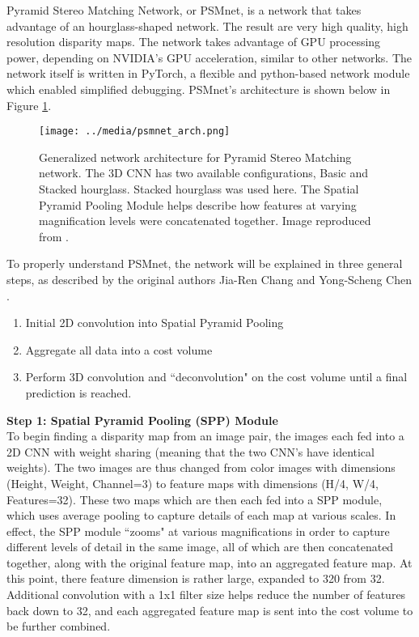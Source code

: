 Pyramid Stereo Matching Network, or PSMnet, is a network that takes advantage of an hourglass-shaped network. The result are very high quality, high resolution disparity maps. The network takes advantage of GPU processing power, depending on NVIDIA's GPU acceleration, similar to other networks. The network itself is written in PyTorch, a flexible and python-based network module which enabled simplified debugging. PSMnet's architecture is shown below in Figure \ref{psmnet_arch}.


\begin{figure}[ht]
	\texttt{[image: ../media/psmnet\_arch.png]}
	\caption{Generalized network architecture for Pyramid Stereo Matching network. The 3D CNN has two available configurations, Basic and Stacked hourglass. Stacked hourglass was used here. The Spatial Pyramid Pooling Module helps describe how features at varying magnification levels were concatenated together. Image reproduced from \cite{chang_pyramid_2018}.}
	\label{psmnet_arch}
\end{figure}


To properly understand PSMnet, the network will be explained in three general steps, as described by the original authors Jia-Ren Chang and Yong-Scheng Chen \cite{chang_pyramid_2018}. 

\begin{enumerate}\itemsep=-0.5em
    \item Initial 2D convolution into Spatial Pyramid Pooling 
    \item Aggregate all data into a cost volume
    \item Perform 3D convolution and ``deconvolution" on the cost volume until a final prediction is reached.
\end{enumerate}

\textbf{{\large Step 1: Spatial Pyramid Pooling (SPP) Module}} \\
To begin finding a disparity map from an image pair, the images each fed into a 2D CNN with weight sharing (meaning that the two CNN's have identical weights). The two images are thus changed from
color images with dimensions (Height, Weight, Channel=3) to feature maps with dimensions (H/4, W/4, Features=32). These two maps which are then each fed into a SPP module, which uses average pooling to capture details of each map at various scales. In effect, the SPP module ``zooms" at various magnifications in order to capture different levels of detail in the same image, all of which are then concatenated together, along with the original feature map, into an aggregated feature map. At this point, there feature dimension is rather large, expanded to 320 from 32. Additional convolution with a 1x1 filter size helps reduce the number of features back down to 32, and each aggregated feature map is sent into the cost volume to be further combined.

